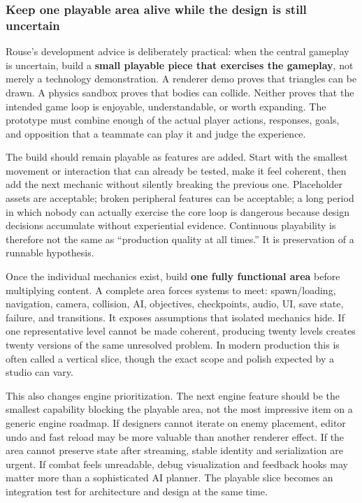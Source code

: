 \subsubsection{Keep one playable area alive while the design is still uncertain}\label{06-engine-ii-ch041-keep-one-playable-area-alive-while-the-design-is-still-uncertain}

Rouse's development advice is deliberately practical: when the central gameplay is uncertain, build a \textbf{small playable piece that exercises the gameplay}, not merely a technology demonstration. A renderer demo proves that triangles can be drawn. A physics sandbox proves that bodies can collide. Neither proves that the intended game loop is enjoyable, understandable, or worth expanding. The prototype must combine enough of the actual player actions, responses, goals, and opposition that a teammate can play it and judge the experience.

The build should remain playable as features are added. Start with the smallest movement or interaction that can already be tested, make it feel coherent, then add the next mechanic without silently breaking the previous one. Placeholder assets are acceptable; broken peripheral features can be acceptable; a long period in which nobody can actually exercise the core loop is dangerous because design decisions accumulate without experiential evidence. Continuous playability is therefore not the same as ``production quality at all times.'' It is preservation of a runnable hypothesis.

Once the individual mechanics exist, build \textbf{one fully functional area} before multiplying content. A complete area forces systems to meet: spawn/loading, navigation, camera, collision, AI, objectives, checkpoints, audio, UI, save state, failure, and transitions. It exposes assumptions that isolated mechanics hide. If one representative level cannot be made coherent, producing twenty levels creates twenty versions of the same unresolved problem. In modern production this is often called a vertical slice, though the exact scope and polish expected by a studio can vary.

This also changes engine prioritization. The next engine feature should be the smallest capability blocking the playable area, not the most impressive item on a generic engine roadmap. If designers cannot iterate on enemy placement, editor undo and fast reload may be more valuable than another renderer effect. If the area cannot preserve state after streaming, stable identity and serialization are urgent. If combat feels unreadable, debug visualization and feedback hooks may matter more than a sophisticated AI planner. The playable slice becomes an integration test for architecture and design at the same time.

